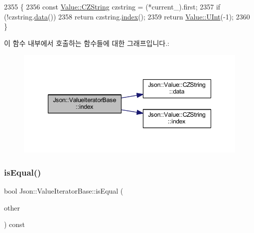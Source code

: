 \begin{DoxyCode}
2355                                     \{
2356   \textcolor{keyword}{const} \hyperlink{class_json_1_1_value_1_1_c_z_string}{Value::CZString} czstring = (*current\_).first;
2357   \textcolor{keywordflow}{if} (!czstring.\hyperlink{class_json_1_1_value_1_1_c_z_string_af6eee54f8dc43a1203d5af6ba0a5c9a2}{data}())
2358     \textcolor{keywordflow}{return} czstring.\hyperlink{class_json_1_1_value_1_1_c_z_string_a0f3ba09401525d4f01dafd577122ee32}{index}();
2359   \textcolor{keywordflow}{return} \hyperlink{class_json_1_1_value_a0933d59b45793ae4aade1757c322a98d}{Value::UInt}(-1);
2360 \}
\end{DoxyCode}
이 함수 내부에서 호출하는 함수들에 대한 그래프입니다.\+:
\nopagebreak
\begin{figure}[H]
\begin{center}
\leavevmode
\includegraphics[width=347pt]{class_json_1_1_value_iterator_base_a549c66a0bd20e9ae772175a5c0d2e88a_cgraph}
\end{center}
\end{figure}
\mbox{\label{class_json_1_1_value_iterator_base_a010b5ad3f3337ae3732e5d7e16ca5e25}} 
\subsubsection{\texorpdfstring{is\+Equal()}{isEqual()}}
{\footnotesize\ttfamily bool Json\+::\+Value\+Iterator\+Base\+::is\+Equal (\begin{DoxyParamCaption}\item[{const \hyperlink{class_json_1_1_value_iterator_base_a9d2a940d03ea06d20d972f41a89149ee}{Self\+Type} \&}]{other }\end{DoxyParamCaption}) const\hspace{0.3cm}{\ttfamily [protected]}}



